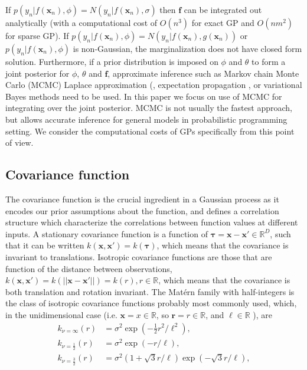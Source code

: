\documentclass[]{interact}
\theoremstyle{plain}%
\theoremstyle{definition}
\theoremstyle{remark}
\begin{document}
If $p(y_n|f(\mathbf{x}_n),\phi)=N(y_n|f(\mathbf{x}_n),\sigma)$ then $\mathbf{f}$ can be integrated out analytically (with a computational cost of $O(n^3)$ for exact GP and $O(nm^2)$ for sparse GP). If $p(y_n|f(\mathbf{x}_n),\phi)=N(y_n|f(\mathbf{x}_n),g(\mathbf{x}_n))$ or $p(y_n|f(\mathbf{x}_n),\phi)$ is non-Gaussian, the marginalization does not have closed form solution.
%
Furthermore, if a prior distribution is imposed on $\phi$ and $\theta$ to form a joint posterior for $\phi$, $\theta$ and $\mathbf{f}$,
approximate inference such as Markov chain Monte Carlo (MCMC) \citep{brooks_2011} Laplace approximation (\citep{williams1998bayesian,rasmussen2006gaussian}, expectation propagation \citep{minka2001expectation}, or variational Bayes methods \citep{gibbs2000variational,csato2000efficient} need to be used.
%
In this paper we focus on use of MCMC for integrating over the joint
posterior. MCMC is not usually the fastest approach, but allows
accurate inference for general models in probabilistic programming
setting. We consider the computational costs of GPs specifically from
this point of view.

\subsection{Covariance function}

The covariance function is the crucial ingredient in a Gaussian process as it encodes our prior assumptions about the function, and defines a correlation structure which characterize the correlations between function values at different inputs. A stationary covariance function is a function of $\bm{\tau}=\mathbf{x}-\mathbf{x}' \in \mathbb{R}^D$, such that it can be written $k(\mathbf{x},\mathbf{x}') = k(\bm{\tau})$, which means that the covariance is invariant to translations. Isotropic covariance functions are those that are function of the distance between observations, $k(\mathbf{x},\mathbf{x}') = k(||\mathbf{x}-\mathbf{x}'||) = k(r), r\in \mathbb{R}$, which means that the covariance is both translation and rotation invariant. The Mat\'ern family with half-integers is the class of isotropic covariance functions probably most commonly used, which, in the unidimensional case (i.e. $\mathbf{x}=x\in \mathbb{R}$, so $\mathbf{r}=r\in \mathbb{R}$, and $\ell\in \mathbb{R}$ ), are
%
\begin{align*}
k_{\nu=\infty}(r)&=\sigma^2 \exp(-\frac{1}{2} r^2/\ell^2),  \\
k_{\nu=\frac{1}{2}}(r)&=\sigma^2 \exp(-r/\ell),  \\
k_{\nu=\frac{3}{2}}(r)&=\sigma^2(1+\sqrt{3}r/\ell) \exp(-\sqrt{3}r/\ell), 
\end{align*}
\end{document}
